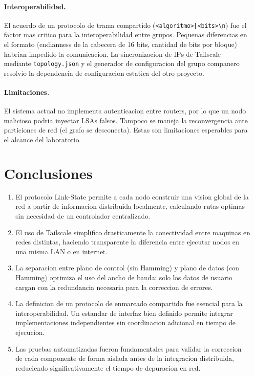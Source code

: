 ﻿\documentclass[12pt, a4paper]{article}
\begin{document}
\paragraph{Interoperabilidad.}
El acuerdo de un protocolo de trama compartido (\texttt{<algoritmo>|<bits>\textbackslash n})
fue el factor mas critico para la interoperabilidad entre grupos. Pequenas
diferencias en el formato (endianness de la cabecera de 16 bits, cantidad de
bits por bloque) habrian impedido la comunicacion. La sincronizacion de IPs
de Tailscale mediante \texttt{topology.json} y el generador de configuracion
del grupo companero resolvio la dependencia de configuracion estatica del otro
proyecto.

\paragraph{Limitaciones.}
El sistema actual no implementa autenticacion entre routers, por lo que un
nodo malicioso podria inyectar LSAs falsos. Tampoco se maneja la reconvergencia
ante particiones de red (el grafo se desconecta). Estas son limitaciones
esperables para el alcance del laboratorio.

\section{Conclusiones}

\begin{enumerate}[leftmargin=*]
    \item El protocolo Link-State permite a cada nodo construir una vision
          global de la red a partir de informacion distribuida localmente,
          calculando rutas optimas sin necesidad de un controlador centralizado.

    \item El uso de Tailscale simplifico drasticamente la conectividad entre
          maquinas en redes distintas, haciendo transparente la diferencia entre
          ejecutar nodos en una misma LAN o en internet.

    \item La separacion entre plano de control (sin Hamming) y plano de datos
          (con Hamming) optimiza el uso del ancho de banda: solo los datos de
          usuario cargan con la redundancia necesaria para la correccion de errores.

    \item La definicion de un protocolo de enmarcado compartido fue esencial
          para la interoperabilidad. Un estandar de interfaz bien definido
          permite integrar implementaciones independientes sin coordinacion
          adicional en tiempo de ejecucion.

    \item Las pruebas automatizadas fueron fundamentales para validar
          la correccion de cada componente de forma aislada antes de la
          integracion distribuida, reduciendo significativamente el tiempo
          de depuracion en red.
\end{enumerate}
\end{document}
